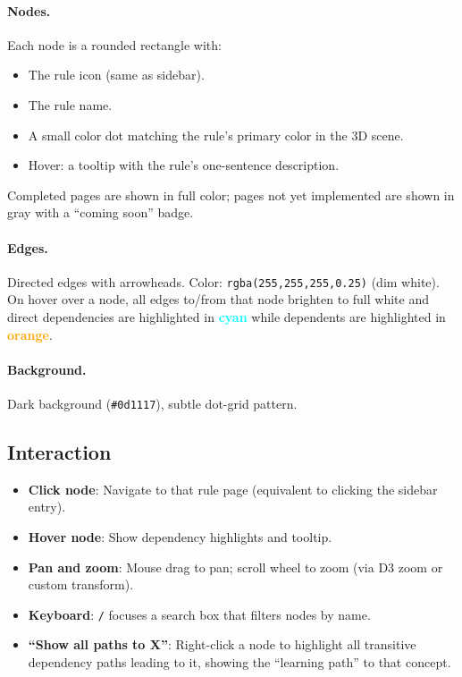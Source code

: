 \documentclass[11pt,a4paper]{article}
\begin{document}
\paragraph{Nodes.}
Each node is a rounded rectangle with:
\begin{itemize}
  \item The rule icon (same as sidebar).
  \item The rule name.
  \item A small color dot matching the rule's primary color in the 3D scene.
  \item Hover: a tooltip with the rule's one-sentence description.
\end{itemize}

\noindent Completed pages are shown in full color; pages not yet implemented
are shown in gray with a ``coming soon'' badge.

\paragraph{Edges.}
Directed edges with arrowheads. Color: \texttt{rgba(255,255,255,0.25)} (dim
white). On hover over a node, all edges to/from that node brighten to full
white and direct dependencies are highlighted in \textcolor{cyan}{\textbf{cyan}}
while dependents are highlighted in \textcolor{orange}{\textbf{orange}}.

\paragraph{Background.}
Dark background (\texttt{\#0d1117}), subtle dot-grid pattern.

\subsection{Interaction}

\begin{itemize}
  \item \textbf{Click node}: Navigate to that rule page (equivalent to clicking
    the sidebar entry).
  \item \textbf{Hover node}: Show dependency highlights and tooltip.
  \item \textbf{Pan and zoom}: Mouse drag to pan; scroll wheel to zoom (via
    D3 zoom or custom transform).
  \item \textbf{Keyboard}: \texttt{/} focuses a search box that filters nodes
    by name.
  \item \textbf{``Show all paths to X''}: Right-click a node to highlight all
    transitive dependency paths leading to it, showing the ``learning path'' to
    that concept.
\end{itemize}
\end{document}
